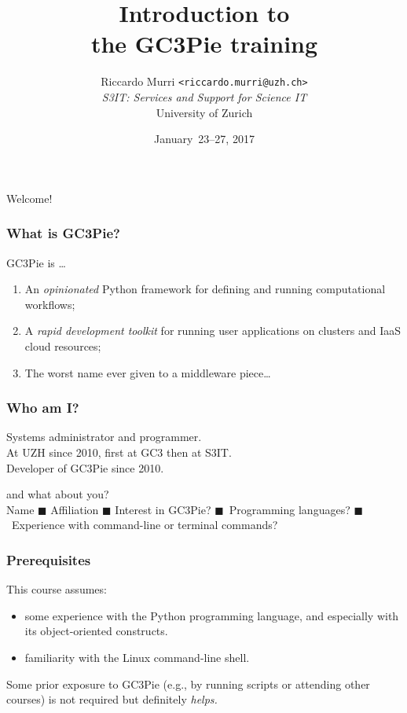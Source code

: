 \documentclass[english,serif,mathserif,xcolor=pdftex,dvipsnames,table]{beamer}
\title[Introduction]{%
  Introduction to \\ the GC3Pie training
}
\author[R. Murri, S3IT UZH]{%
  Riccardo Murri \texttt{<riccardo.murri@uzh.ch>}
  \\[1ex]
  \emph{S3IT: Services and Support for Science IT}
  \\[1ex]
  University of Zurich
}
\date{January~23--27, 2017}
\begin{document}
\maketitle

\begin{frame}
  \begin{center}
    {\Huge Welcome!}
  \end{center}
\end{frame}


\begin{frame}
  \frametitle{What is GC3Pie?}
  GC3Pie is \ldots
  \begin{enumerate}
  \item \alert<2>{An \emph{opinionated} Python framework for defining and running computational workflows;}
  \item A \emph{rapid development toolkit} for running user applications on clusters and IaaS cloud resources;
  \item The worst name ever given to a middleware piece\ldots
  \end{enumerate}

  \+
\end{frame}


\begin{frame}
  \frametitle{Who am I?}
  \begin{center}
    Systems administrator and programmer.
    \\ \+
    At UZH since 2010, first at GC3 then at S3IT.
    \\ \+
    Developer of GC3Pie since 2010.
  \end{center}
\end{frame}


\begin{frame}
  \begin{center}
    {\Huge and what about you?}
    \\ \+ \+
    \small
    Name $\blacksquare$ Affiliation $\blacksquare$ Interest in GC3Pie?
    $\blacksquare$~Programming languages?
    $\blacksquare$~Experience with command-line or terminal commands?
  \end{center}
\end{frame}


\begin{frame}
  \frametitle{Prerequisites}
  This course assumes:

  \begin{itemize}
  \item some experience with the Python programming language, and especially
    with its object-oriented constructs.
  \item familiarity with the Linux command-line shell.
  \end{itemize}

  \+
  Some prior exposure to GC3Pie (e.g., by running scripts or attending other
  courses) is not required but definitely \emph{helps.}
\end{frame}
\end{document}
